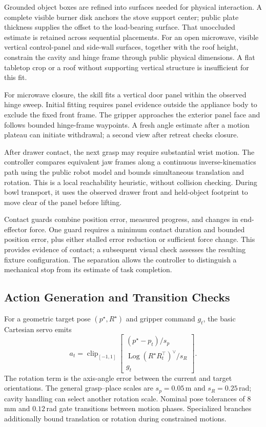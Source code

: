 \documentclass[letterpaper,10pt,conference]{ieeeconf}
\begin{document}
Grounded object boxes are refined into surfaces needed for physical
interaction. A complete visible burner disk anchors the stove support center;
public plate thickness supplies the offset to the load-bearing surface.
That unoccluded estimate is retained across sequential placements. For an
open microwave, visible vertical control-panel and side-wall surfaces,
together with the roof height, constrain the cavity and hinge frame through
public physical dimensions. A flat tabletop crop or a roof without supporting
vertical structure is insufficient for this fit.

For microwave closure, the skill fits a vertical door panel within the
observed hinge sweep. Initial fitting requires panel evidence outside the
appliance body to exclude the fixed front frame. The gripper approaches
the exterior panel face and follows bounded hinge-frame waypoints.
A fresh angle estimate after a motion plateau can initiate withdrawal;
a second view after retreat checks closure.

After drawer contact, the next grasp may require substantial wrist motion.
The controller compares equivalent jaw frames along a continuous
inverse-kinematics path using the public robot model and bounds simultaneous
translation and rotation. This is a local reachability heuristic, without
collision checking. During bowl transport, it uses the observed drawer front
and held-object footprint to move clear of the panel before lifting.

Contact guards combine position error, measured progress, and changes in
end-effector force. One guard requires a minimum contact duration and bounded
position error, plus either stalled error reduction or sufficient force
change. This provides evidence of contact; a subsequent visual check assesses
the resulting fixture configuration. The separation allows the controller
to distinguish a mechanical stop from its estimate of task completion.

\subsection{Action Generation and Transition Checks}
For a geometric target pose $(p^\star,R^\star)$ and gripper command $g_t$,
the basic Cartesian servo emits
\begin{equation}
 a_t=\operatorname{clip}_{[-1,1]}
 \begin{bmatrix}
 (p^\star-p_t)/s_p\\
 \operatorname{Log}(R^\star R_t^\top)^\vee/s_R\\
 g_t
 \end{bmatrix}.
 \label{eq:servo}
\end{equation}
The rotation term is the axis-angle error between the current and target
orientations.
The general grasp--place scales are $s_p=0.05$\,m and
$s_R=0.25$\,rad; cavity handling can select another rotation scale.
Nominal pose tolerances of $8$\,mm and $0.12$\,rad gate transitions between
motion phases. Specialized branches additionally bound translation or
rotation during constrained motions.
\end{document}
